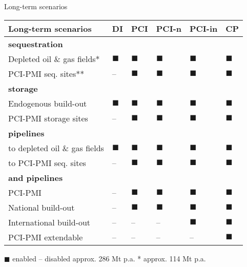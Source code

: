 \documentclass[10pt,aspectratio=169,dvipsnames]{beamer}
\begin{document}
\begin{frame}{Long-term scenarios}
  \scriptsize
  \begin{tabularx}{\textwidth}{R{3.9cm}>{\centering\arraybackslash}X>{\centering\arraybackslash}X>{\centering\arraybackslash}X>{\centering\arraybackslash}X>{\centering\arraybackslash}X}
      \toprule
      \textbf{Long-term scenarios} & 
      \textbf{DI} & 
      \textbf{PCI} & 
      \textbf{PCI-n} & 
      \textbf{PCI-in} & 
      \textbf{CP} \\
      \midrule
      \textbf{ sequestration} & & & & & \\
      Depleted oil \& gas fields* & $\blacksquare$ & $\blacksquare$ & $\blacksquare$ & $\blacksquare$ & $\blacksquare$ \\
      PCI-PMI seq. sites** & -- & $\blacksquare$ & $\blacksquare$ & $\blacksquare$ & $\blacksquare$ \\
      \midrule
      \textbf{ storage} & & & & & \\
      Endogenous build-out & $\blacksquare$ & $\blacksquare$ & $\blacksquare$ & $\blacksquare$ & $\blacksquare$ \\
      PCI-PMI storage sites & -- & $\blacksquare$ & $\blacksquare$ & $\blacksquare$ & $\blacksquare$ \\
      \midrule
      \textbf{ pipelines} & & & & & \\
      to depleted oil \& gas fields & $\blacksquare$ & $\blacksquare$ & $\blacksquare$ & $\blacksquare$ & $\blacksquare$ \\
      to PCI-PMI seq. sites & -- & $\blacksquare$ & $\blacksquare$ & $\blacksquare$ & $\blacksquare$ \\
      \midrule
      \textbf{ and  pipelines} & & & & & \\
      PCI-PMI & -- & $\blacksquare$ & $\blacksquare$ & $\blacksquare$ & $\blacksquare$ \\
      National build-out & -- & $\blacksquare$ & $\blacksquare$ & $\blacksquare$ & $\blacksquare$ \\
      International build-out & -- & -- & -- & $\blacksquare$ & $\blacksquare$ \\
      PCI-PMI extendable & -- & -- & -- & -- & $\blacksquare$ \\
      \bottomrule
  \end{tabularx}
  \vspace{0.5em}
  \centering
  {\scriptsize $\blacksquare$ enabled \quad -- disabled \quad * approx. 286 Mt p.a. \quad ** approx. 114 Mt p.a.}
\end{frame}
\end{document}
